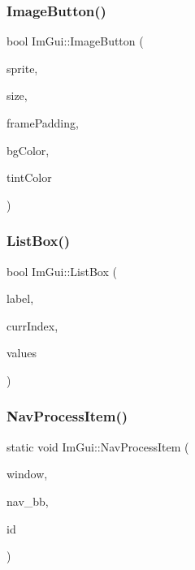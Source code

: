 \subsubsection{\texorpdfstring{Image\+Button()}{ImageButton()}\hspace{0.1cm}{\footnotesize\ttfamily [4/4]}}
{\footnotesize\ttfamily bool Im\+Gui\+::\+Image\+Button (\begin{DoxyParamCaption}\item[{const sf\+::\+Sprite \&}]{sprite,  }\item[{const sf\+::\+Vector2f \&}]{size,  }\item[{const int}]{frame\+Padding,  }\item[{const sf\+::\+Color \&}]{bg\+Color,  }\item[{const sf\+::\+Color \&}]{tint\+Color }\end{DoxyParamCaption})}

\mbox{\label{namespace_im_gui_ac04be3d604f4b471625fb9823a6bb70b}} 
\subsubsection{\texorpdfstring{List\+Box()}{ListBox()}}
{\footnotesize\ttfamily bool Im\+Gui\+::\+List\+Box (\begin{DoxyParamCaption}\item[{const char $\ast$}]{label,  }\item[{int $\ast$}]{curr\+Index,  }\item[{std\+::vector$<$ std\+::string $>$ \&}]{values }\end{DoxyParamCaption})}

\mbox{\label{namespace_im_gui_a294f4417f6a5aa0b6528a4d70f8922a7}} 
\subsubsection{\texorpdfstring{Nav\+Process\+Item()}{NavProcessItem()}}
{\footnotesize\ttfamily static void Im\+Gui\+::\+Nav\+Process\+Item (\begin{DoxyParamCaption}\item[{Im\+Gui\+Window $\ast$}]{window,  }\item[{const Im\+Rect \&}]{nav\+\_\+bb,  }\item[{const Im\+Gui\+ID}]{id }\end{DoxyParamCaption})\hspace{0.3cm}{\ttfamily [static]}}


